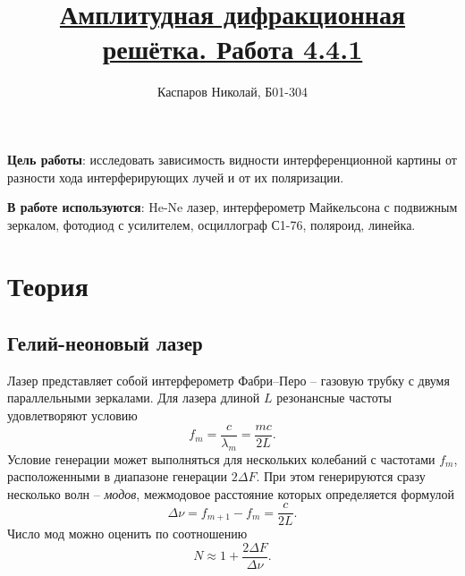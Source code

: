\documentclass[a4paper]{article}
\title{\underline{Амплитудная дифракционная решётка. Работа 4.4.1}}
\author{Каспаров Николай, Б01-304}
\begin{document}
\maketitle
\begin{center}
\Large{\textbf{ }}
\end{center}

\textbf{Цель работы}: исследовать зависимость видности интерференционной картины от разности хода интерферирующих лучей и от их поляризации.

\textbf{В работе используются}: He-Ne лазер, интерферометр Майкельсона с подвижным зеркалом, фотодиод с усилителем, осциллограф С1-76, поляроид, линейка.

\section*{Теория}
\subsection*{Гелий-неоновый лазер}
Лазер представляет собой интерферометр Фабри–Перо – газовую трубку с двумя параллельными зеркалами. Для лазера длиной $L$ резонансные частоты удовлетворяют условию
\begin{equation}
f_m = \dfrac{c}{\lambda_m} = \dfrac{mc}{2L}.
\end{equation}
Условие генерации может выполняться для нескольких колебаний с частотами $f_m$, расположенными в диапазоне генерации $2\Delta F$. При этом генерируются сразу несколько волн – \textit{модов}, межмодовое расстояние которых определяется формулой
\begin{equation}
\Delta \nu = f_{m+1} - f_m = \dfrac{c}{2L}.
\end{equation}
Число мод можно оценить по соотношению 
\begin{equation}
N \approx 1 + \dfrac{2\Delta F}{\Delta \nu}.
\end{equation}
\end{document}
